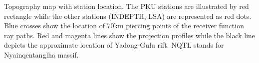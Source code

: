 Topography map with station location. The PKU stations are illustrated by red rectangle while the other stations (INDEPTH, LSA) are represented as red dots. Blue crosses show the location of 70km piercing points of the receiver function ray paths. Red and magenta lines show the projection profiles while the black line depicts the approximate location of Yadong-Gulu rift. NQTL stands for Nyainqentanglha massif.